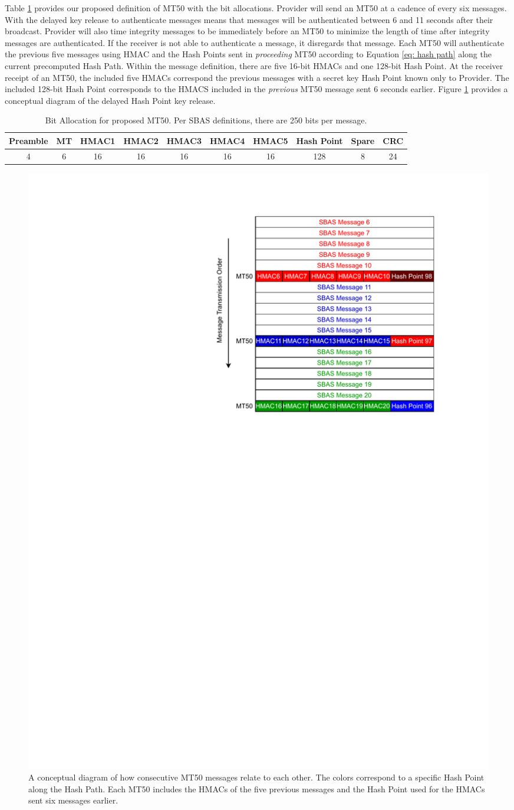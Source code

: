 \documentclass[letterpaper,times]{IONconf/IONconf}
\begin{document}
Table \ref{tab: littlemac} provides our proposed definition of MT50 with the bit allocations.
Provider will send an MT50 at a cadence of every six messages.
With the delayed key release to authenticate messages means that messages will be authenticated between 6 and 11 seconds after their broadcast.
Provider will also time integrity messages to be immediately before an MT50 to minimize the length of time after integrity messages are authenticated.
If the receiver is not able to authenticate a message, it disregards that message.
Each MT50 will authenticate the previous five messages using HMAC and the Hash Points sent in {\em proceeding} MT50 according to Equation \eqref{eq: hash path} along the current precomputed Hash Path.
Within the message definition, there are five 16-bit HMACs and one 128-bit Hash Point.
At the receiver receipt of an MT50, the included five HMACs correspond the previous messages with a secret key Hash Point known only to Provider.
The included 128-bit Hash Point corresponds to the HMACS included in the {\em previous} MT50 message sent 6 seconds earlier.
Figure \ref{fig: MT50 Schedule} provides a conceptual diagram of the delayed Hash Point key release.

\begin{table}[H]
\center
\begin{tabular}{|c|c|c|c|c|c|c|c|c|c|} \hline
	Preamble & MT & HMAC1 & HMAC2 & HMAC3 & HMAC4 & HMAC5 & Hash Point & Spare & CRC \\ \hline
	4 & 6 & 16 & 16 & 16 & 16 & 16 & 128 & 8 & 24 \\ \hline
\end{tabular}
\caption{Bit Allocation for proposed MT50. Per SBAS definitions, there are 250 bits per message.}
\label{tab: littlemac}
\end{table}{}

\begin{figure}
\centering
\includegraphics[width=0.5\linewidth]{fig/MT50Schedule.pdf}
\caption{A conceptual diagram of how consecutive MT50 messages relate to each other. The colors correspond to a specific Hash Point along the Hash Path. Each MT50 includes the HMACs of the five previous messages and the Hash Point used for the HMACs sent six messages earlier.}
\label{fig: MT50 Schedule}
\end{figure}
\end{document}
